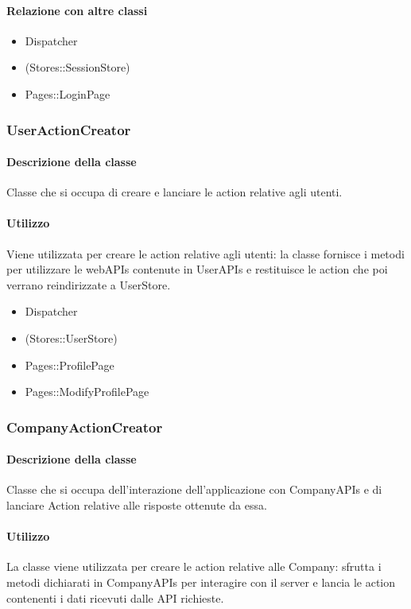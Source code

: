\paragraph*{Relazione con altre classi}
\begin{itemize}
\item Dispatcher
\item (Stores::SessionStore)
\item Pages::LoginPage
\end{itemize}

\subsubsection{UserActionCreator}
\paragraph*{Descrizione della classe}
Classe che si occupa di creare e lanciare le action relative agli utenti.
\paragraph*{Utilizzo}
Viene utilizzata per creare le action relative agli utenti: la classe fornisce i metodi per utilizzare le webAPIs contenute in UserAPIs e restituisce le action che poi verrano reindirizzate a UserStore.

\begin{itemize}
\item Dispatcher
\item (Stores::UserStore)
\item Pages::ProfilePage
\item Pages::ModifyProfilePage
\end{itemize}

\subsubsection{CompanyActionCreator}
\paragraph*{Descrizione della classe}
Classe che si occupa dell'interazione dell'applicazione con CompanyAPIs e di lanciare Action relative alle risposte ottenute da essa.
\paragraph*{Utilizzo}
La classe viene utilizzata per creare le action relative alle Company: sfrutta i metodi dichiarati in CompanyAPIs per interagire con il server e lancia le action contenenti i dati ricevuti dalle API richieste.

